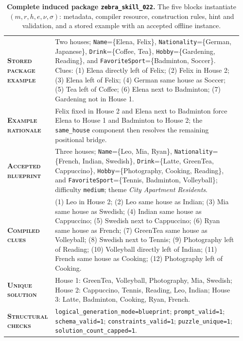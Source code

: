\begin{table}[htbp]
\centering
\begin{minipage}{0.97\textwidth}
\raggedright
\small
\setlength{\tabcolsep}{3pt}
\renewcommand{\arraystretch}{1.16}
\vspace{0.35em}
\begin{tabular}{@{}>{\raggedright\arraybackslash\bfseries}p{0.17\linewidth} >{\raggedright\arraybackslash}p{0.79\linewidth}@{}}
    \textsc{Stored package example} & Two houses; \texttt{Name}=\{Elena, Felix\}, \texttt{Nationality}=\{German, Japanese\}, \texttt{Drink}=\{Coffee, Tea\}, \texttt{Hobby}=\{Gardening, Reading\}, and \texttt{FavoriteSport}=\{Badminton, Soccer\}. Clues: (1) Elena directly left of Felix; (2) Felix in House 2; (3) Elena left of Felix; (4) German same house as Soccer; (5) Tea left of Coffee; (6) Elena next to Badminton; (7) Gardening not in House 1. \\
    \textsc{Example rationale} & Felix fixed in House 2 and Elena next to Badminton force Elena to House 1 and Badminton to House 2; the \texttt{same\_house} component then resolves the remaining positional bridge. \\
    \textsc{Accepted blueprint} & Three houses; \texttt{Name}=\{Leo, Mia, Ryan\}, \texttt{Nationality}=\{French, Indian, Swedish\}, \texttt{Drink}=\{Latte, GreenTea, Cappuccino\}, \texttt{Hobby}=\{Photography, Cooking, Reading\}, and \texttt{FavoriteSport}=\{Tennis, Badminton, Volleyball\}; difficulty \texttt{medium}; theme \emph{City Apartment Residents}. \\
    \textsc{Compiled clues} & (1) Leo in House 2; (2) Leo same house as Indian; (3) Mia same house as Swedish; (4) Indian same house as Cappuccino; (5) Swedish next to Cappuccino; (6) Ryan same house as French; (7) GreenTea same house as Volleyball; (8) Swedish next to Tennis; (9) Photography left of Reading; (10) Volleyball directly left of Indian; (11) French same house as Cooking; (12) Photography left of Cooking. \\
    \textsc{Unique solution} & House 1: GreenTea, Volleyball, Photography, Mia, Swedish; House 2: Cappuccino, Tennis, Reading, Leo, Indian; House 3: Latte, Badminton, Cooking, Ryan, French. \\
    \textsc{Structural checks} & \texttt{logical\_generation\_mode=blueprint}; \texttt{prompt\_valid=1}; \texttt{schema\_valid=1}; \texttt{constraints\_valid=1}; \texttt{puzzle\_unique=1}; \texttt{solution\_count\_capped=1}. \\
\end{tabular}
\vspace{0.45em}
\end{minipage}
\caption{\textbf{Complete induced package \texttt{zebra\_skill\_022}.} The five blocks instantiate $(m,r,h,e,\nu,\sigma)$: metadata, compiler resource, construction rules, hint and validation, and a stored example with an accepted offline instance.}
\label{tab:complete_logical_skill_anchor}
\end{table}

